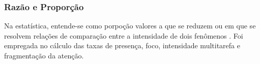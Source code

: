 

\subsubsection{Razão e Proporção}
Na estatística, entende-se como porpoção valores a que se reduzem ou em que se resolvem relações de comparação entre a intensidade de dois fenômenos \cite{da1970dicionario}. Foi empregada no cálculo das taxas de presença, foco, intensidade multitarefa e fragmentação da atenção.


